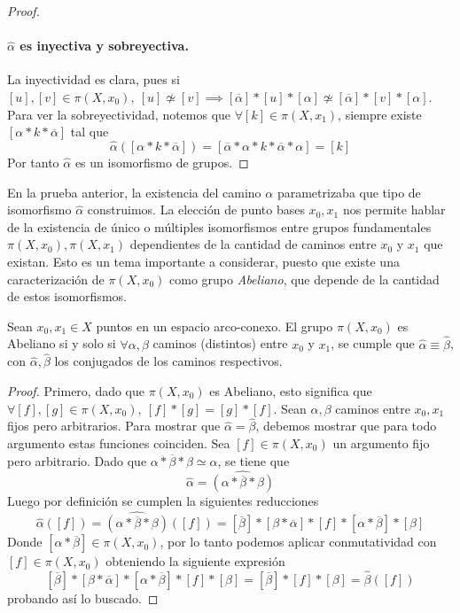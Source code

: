 {\begin{proof}
  \paragraph{\(\hat \alpha\) es inyectiva y sobreyectiva.} La inyectividad es
  clara, pues si \([u],[v] \in \pi (X, x_0),\ [u] \not \simeq [v]
  \implies [\overline{\alpha}] * [u] * [\alpha] \not \simeq
    [\overline{\alpha}] * [v]
  * [\alpha]\). Para ver la sobreyectividad, notemos que \(\forall [k] \in
  \pi (X, x_1) \), siempre existe \( [\alpha * k * \overline{\alpha}]\) tal
  que
  \[ \hat \alpha ([\alpha * k * \overline{\alpha}]) = [\overline{\alpha}
    * \alpha * k * \overline{\alpha} * \alpha] = [k]\]
  Por tanto \(\hat \alpha\) es un isomorfismo de grupos.
\end{proof}
En la prueba anterior, la existencia del camino \(\alpha\)
parametrizaba que tipo de isomorfismo \(\hat \alpha\) construimos.
La elección de punto bases
\(x_0, x_1\) nos permite hablar de la existencia de único o múltiples
isomorfismos entre grupos fundamentales \(\pi (X, x_0), \pi (X, x_1) \)
dependientes de la cantidad de caminos entre \(x_0\) y \(x_1\) que
existan. Esto es un tema importante a considerar, puesto que existe una
caracterización de \(\pi (X, x_0) \) como grupo \emph{Abeliano}, que depende de
la cantidad de estos isomorfismos.
\begin{teorema}
  Sean \(x_0, x_1 \in X\) puntos en un espacio arco-conexo. El grupo
  \(\pi (X, x_0) \) es Abeliano si y solo si \(\forall \alpha, \beta\)
  caminos (distintos) entre \(x_0\) y \(x_1\), se cumple que \(\hat
  \alpha \equiv \hat \beta\), con \(\hat \alpha, \hat \beta\) los
  conjugados de los caminos respectivos.
\end{teorema}
\begin{proof}
  Primero, dado que \(\pi (X, x_0)\) es
  Abeliano, esto significa que \(\forall [f],[g] \in \pi (X, x_0),\ [f]
  * [g] = [g] * [f]\). Sean \(\alpha, \beta\) caminos entre \(x_0,x_1\)
  fijos pero arbitrarios. Para mostrar que \( \hat \alpha = \hat \beta\),
  debemos mostrar que para todo argumento estas funciones coinciden. Sea
  \([f] \in \pi (X, x_0) \) un argumento fijo pero arbitrario. Dado que
  \(\alpha * \overline{\beta} * \beta \simeq \alpha \), se tiene que
  \[ \hat \alpha = \widehat{(\alpha * \overline{\beta} * \beta)}\]
  Luego por definición se cumplen la siguientes reducciones
  \[ \hat \alpha ([f]) = \widehat{(\alpha * \overline{\beta} * \beta)} ([f]) =
    [\overline{\beta}] * [\beta * \overline{\alpha}] * [f] * [\alpha *
    \overline{\beta}] * [\beta]
  \]
  Donde \([\alpha * \overline{\beta}] \in \pi (X, x_0) \), por lo tanto
  podemos aplicar conmutatividad con \([f] \in \pi (X,x_0)\) obteniendo la
  siguiente expresión
  \[
    [\overline{\beta}] * [\beta * \overline{\alpha}] * [\alpha *
    \overline{\beta}] * [f] * [\beta] = [\overline{\beta}] * [f] * [\beta] =
    \hat \beta ([f])
  \]
  probando así lo buscado.


\end{proof}}
